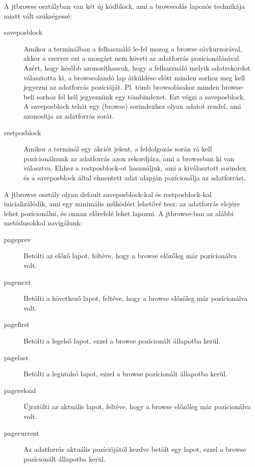 A jtbrowse osztályban van két új kódblock, ami a browseolás
lapozós technikája miatt vált szükségessé:

\begin{description}
\item[saveposblock]
Amikor a terminálban a felhasználó le-fel mozog a browse
sávkurzorával, akkor a szerver ezt a mozgást nem követi
az adatforrás pozicionálásával. Azért, hogy később azonosíthassuk,
hogy a felhasználó melyik adatrekordot választotta ki,
a browseolandó lap átküldése előtt minden sorhoz meg kell jegyezni
az adatforrás pozícióját. Pl. tömb browsolásakor
minden browse-beli sorhoz fel kell jegyeznünk egy tömbindexet.
Ezt végzi a saveposblock. A saveposblock tehát egy (browse) 
sorindexhez olyan adatot rendel,
ami azonosítja az adatforrás sorát. \par

\item[restposblock]
Amikor a terminál egy akciót jelent, a feldolgozás során
rá kell pozícionálnunk az adatforrás azon rekordjára, 
ami a browseban ki van választva. Ehhez a restposblock-ot használjuk,
ami a kiválasztott sorindex és a saveposblock által elmentett
adat alapján pozícionálja az adatforrást. \par
\end{description}
 
A jtbrowse osztály olyan default saveposblock-kal 
és restposblock-kal  inicializálódik, ami egy minimális
működést lehetővé tesz: az adatforrás elejére lehet
pozícionálni, és onnan előrefelé lehet lapozni.
A jtbrowse-ban az alábbi metódusokkal navigálunk:

\begin{description}
\item[pageprev] 
    Betölti az előző lapot, 
    feltéve, hogy a browse előzőleg már pozícionálva volt.
\item[pagenext]
    Betölti a következő lapot, 
    feltéve, hogy a browse előzőleg már pozícionálva volt.
\item[pagefirst]
    Betölti a legelső lapot,  
    ezzel a browse pozícionált állapotba kerül.
\item[pagelast]
    Betölti a legutolsó lapot, 
    ezzel a browse pozícionált állapotba kerül.
\item[pagereload]
    Újratölti az aktuális lapot, 
    feltéve, hogy a browse előzőleg már  pozícionálva volt.
\item[pagecurrent]
    Az adatforrás aktuális pozíciójától kezdve betölt egy lapot,
    ezzel a browse pozícionált állapotba kerül.
\end{description}


